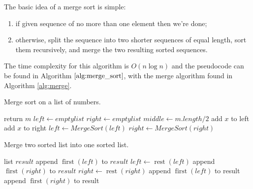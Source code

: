 \begin{definition}
    The basic idea of a merge sort is simple:
    \begin{enumerate}
        \item if given sequence of no more than one element then we're done;
        \item otherwise, split the sequence into two shorter sequences of equal length, sort them recursively, and merge the two resulting sorted sequences.
    \end{enumerate}
    
    The time complexity for this algorithm is $O(n\log n)$ and the pseudocode can be found in Algorithm $\ref{alg:merge_sort}$, with the merge algorithm found in Algorithm \ref{alg:merge}.
\end{definition}


\begin{algorithm}
    \caption{Merge sort on a list of numbers.}
    \label{alg:merge_sort}
    \begin{algorithmic}[1]
                \State return $m$
            \EndIf
            \State $left\gets empty list$
            \State $right\gets empty list$
            \State $middle\gets m.length/2$
                    \State add $x$ to left
                \Else
                    \State add $x$ to right
                \EndIf
            \EndFor
            \State $left\gets MergeSort(left)$
            \State $right\gets MergeSort(right)$
            \State {}
        \EndProcedure
    \end{algorithmic}
\end{algorithm}

\begin{algorithm}
    \caption{Merge two sorted list into one sorted list.}
    \label{alg:merge}
    \begin{algorithmic}[1]
            \State list $result$
                    \State append $\operatorname{first}(left)$ to $result$
                    \State $left\gets\operatorname{rest}(left)$
                \Else
                    \State append $\operatorname{first}(right)$ to $result$
                    \State $right\gets\operatorname{rest}(right)$
                \EndIf
            \EndWhile
                \State append $\operatorname{first}(left)$ to result
            \EndWhile
                \State append $\operatorname{first}(right)$ to result
            \EndWhile
        \EndProcedure
    \end{algorithmic}
\end{algorithm}

